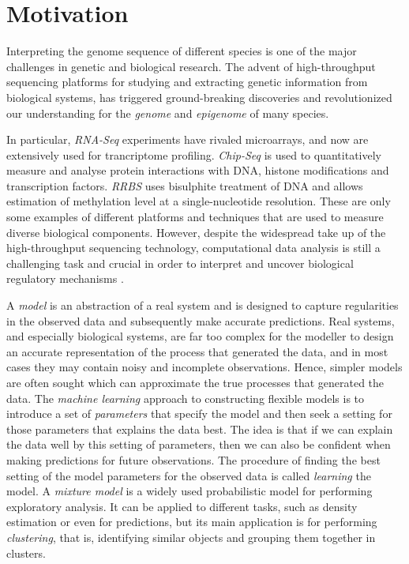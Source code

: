 \section{Motivation} \label{motivation-intro-l}
Interpreting the genome sequence of different species is one of the major challenges in genetic and biological research. The advent of high-throughput sequencing platforms for studying and extracting genetic information from biological systems, has triggered ground-breaking discoveries and revolutionized our understanding for the \emph{genome} and \emph{epigenome} of many species. 

In particular, \emph{RNA-Seq} experiments \citep{Marioni2008} have rivaled microarrays, and now are extensively used for trancriptome profiling. \emph{Chip-Seq} \citep{Park2009} is used to quantitatively measure and analyse protein interactions with DNA, \ie histone modifications and transcription factors. \emph{RRBS} \citep{Meissner2005} uses bisulphite treatment of DNA and allows estimation of methylation level at a single-nucleotide resolution. These are only some examples of different platforms and techniques that are used to measure diverse biological components. However, despite the widespread take up of the high-throughput sequencing technology, computational data analysis is still a challenging task and crucial in order to interpret and uncover biological regulatory mechanisms \citep{Park2009}.

A \emph{model} is an abstraction of a real system and is designed to capture regularities in the observed data and subsequently make accurate predictions. Real systems, and especially biological systems, are far too complex for the modeller to design an accurate representation of the process that generated the data, and in most cases they may contain noisy and incomplete observations. Hence, simpler models are often sought which can approximate the true processes that generated the data. The \emph{machine learning} approach to constructing flexible models is to introduce a set of \emph{parameters} that specify the model and then seek a setting for those parameters that explains the data best. The idea is that if we can explain the data well by this setting of parameters, then we can also be confident when making predictions for future observations. The procedure of finding the best setting of the model parameters for the observed data is called \emph{learning} the model. A \emph{mixture model} is a widely used probabilistic model for performing exploratory analysis. It can be applied to different tasks, such as density estimation or even for predictions, but its main application is for performing \emph{clustering}, that is, identifying similar objects and grouping them together in clusters. 

